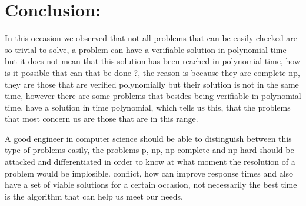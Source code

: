 \section{Conclusion:}

In this occasion we observed that not all problems that can be easily checked are so trivial to solve, a problem can have a verifiable solution in polynomial time but it does not mean that this solution has been reached in polynomial time, how is it possible that can that be done ?, the reason is because they are complete np, they are those that are verified polynomially but their solution is not in the same time, however there are some problems that besides being verifiable in polynomial time, have a solution in time polynomial, which tells us this, that the problems that most concern us are those that are in this range. \hfill \break

A good engineer in computer science should be able to distinguish between this type of problems easily, the problems p, np, np-complete and np-hard should be attacked and differentiated in order to know at what moment the resolution of a problem would be implosible. conflict, how can improve response times and also have a set of viable solutions for a certain occasion, not necessarily the best time is the algorithm that can help us meet our needs.

\pagebreak